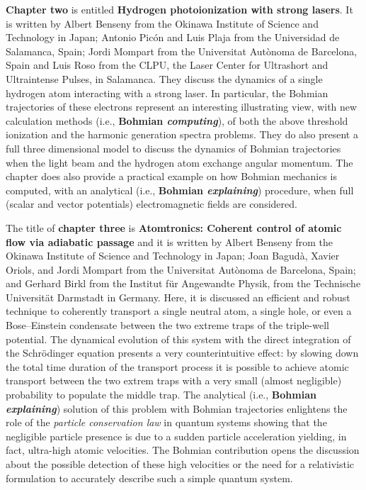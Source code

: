\documentclass[nofootinbib, secnumarabic, amsmath, nobibnotes,11pt,aps,pra, floatfix]{revtex4-1}
\begin{document}
\textbf{Chapter two} is entitled \textbf{Hydrogen photoionization with strong lasers}. It is written by Albert Benseny from the Okinawa Institute of Science and Technology in Japan; Antonio Pic\'on and Luis Plaja from the Universidad de Salamanca, Spain; Jordi Mompart from the Universitat Aut\`{o}noma de Barcelona, Spain and Luis Roso from the CLPU, the Laser Center for Ultrashort and Ultraintense Pulses, in Salamanca. They discuss the dynamics of a single hydrogen atom interacting with a strong laser. In particular, the Bohmian trajectories of these electrons represent an interesting illustrating view, with new calculation methods (i.e., \textbf{Bohmian \emph{computing}}), of both  the above threshold ionization and the harmonic generation spectra problems. They do also present a full three dimensional model to discuss the dynamics of Bohmian trajectories when the light beam and the hydrogen atom exchange angular momentum. The chapter does also provide a practical example on how Bohmian mechanics is computed, with an analytical (i.e., \textbf{Bohmian \emph{explaining}}) procedure, when full (scalar and vector potentials) electromagnetic fields are considered.

The title of \textbf{chapter three} is \textbf{Atomtronics: Coherent control of atomic flow via adiabatic passage} and it is written by Albert Benseny from the Okinawa Institute of Science and Technology in Japan; Joan Bagud\`{a}, Xavier Oriols, and Jordi Mompart from the Universitat Aut\`{o}noma de Barcelona, Spain; and Gerhard Birkl from the Institut f\"ur Angewandte Physik, from the Technische Universit\"at Darmstadt in Germany. Here, it is discussed an efficient and robust technique to coherently transport a single neutral atom, a single hole, or even a Bose--Einstein condensate between the two extreme traps of the triple-well potential. The dynamical evolution of this system with the direct integration of the Schr\"odinger equation presents a very counterintuitive effect: by slowing down the total time duration of the transport process it is possible to achieve atomic transport between the two extrem traps with a very small (almost negligible) probability to populate the middle trap. The analytical (i.e., \textbf{Bohmian \emph{explaining}}) solution of this problem with Bohmian trajectories enlightens the role of the \emph{particle conservation law} in quantum systems showing that the negligible particle presence is due to a sudden particle acceleration yielding, in fact, ultra-high atomic velocities. The Bohmian contribution opens the discussion about the possible detection of these high velocities or the need for a relativistic formulation to accurately describe such a simple quantum system.
\end{document}
